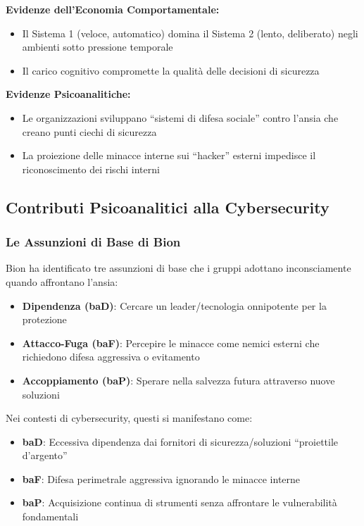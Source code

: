 \documentclass[11pt,a4paper]{article}
\begin{document}
\textbf{Evidenze dell'Economia Comportamentale:}
\begin{itemize}
\item Il Sistema 1 (veloce, automatico) domina il Sistema 2 (lento, deliberato) negli ambienti sotto pressione temporale\cite{kahneman2011}
\item Il carico cognitivo compromette la qualità delle decisioni di sicurezza\cite{beautement2008}
\end{itemize}

\textbf{Evidenze Psicoanalitiche:}
\begin{itemize}
\item Le organizzazioni sviluppano ``sistemi di difesa sociale'' contro l'ansia che creano punti ciechi di sicurezza\cite{menzies1960}
\item La proiezione delle minacce interne sui ``hacker'' esterni impedisce il riconoscimento dei rischi interni\cite{klein1946}
\end{itemize}

\subsection{Contributi Psicoanalitici alla Cybersecurity}

\subsubsection{Le Assunzioni di Base di Bion}

Bion\cite{bion1961} ha identificato tre assunzioni di base che i gruppi adottano inconsciamente quando affrontano l'ansia:
\begin{itemize}
\item \textbf{Dipendenza (baD)}: Cercare un leader/tecnologia onnipotente per la protezione
\item \textbf{Attacco-Fuga (baF)}: Percepire le minacce come nemici esterni che richiedono difesa aggressiva o evitamento
\item \textbf{Accoppiamento (baP)}: Sperare nella salvezza futura attraverso nuove soluzioni
\end{itemize}

Nei contesti di cybersecurity, questi si manifestano come:
\begin{itemize}
\item \textbf{baD}: Eccessiva dipendenza dai fornitori di sicurezza/soluzioni ``proiettile d'argento''
\item \textbf{baF}: Difesa perimetrale aggressiva ignorando le minacce interne
\item \textbf{baP}: Acquisizione continua di strumenti senza affrontare le vulnerabilità fondamentali
\end{itemize}
\end{document}
